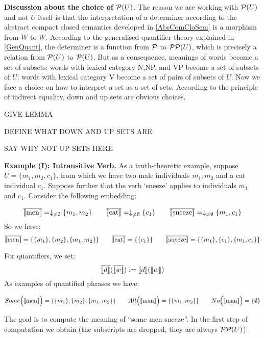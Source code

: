 \bigskip
\noindent
{\bf Discussion about the choice of ${\cal P}(U)$}. The reason we are working with ${\cal P}(U)$ and not $U$ itself is that the interpretation of a determiner according to the  abstract compact closed semantics developed in \ref{AbsComCloSem}  is a morphism from $W$ to $W$. According to the generalised quantifier theory explained in \ref{GenQuant}, the determiner is a function from ${\cal P}$ to ${\cal P}{\cal P}(U)$, which is precisely a relation from ${\cal P}(U)$ to ${\cal P}(U)$.  But as a consequence, meanings of words become a set of subsets: words with lexical category N,NP, and VP become  a set of subsets  of $U$; words with lexical category V become a set of pairs of subsets of $U$.  Now we face  a choice on how to interpret a set as a set of sets. According to the principle of indirect equality, down and up sets are obvious choices. 


GIVE LEMMA

DEFINE WHAT DOWN AND UP SETS ARE

SAY WHY NOT UP SETS HERE


\bigskip
\bigskip
\noindent
{\bf Example (I): Intransitive Verb.} As a truth-theoretic  example,  suppose $U = \{m_1, m_2, c_1\}$, from which we have two male individuals $m_1, m_2$  and a cat   individual $c_1$.  Suppose further that  the verb `sneeze'  applies to individuals $m_1$ and $c_1$. Consider the following embedding:

\[
\overline{[\![ \text{men} ]\!]} =  \downarrow_{\neq \emptyset}\{m_1, m_2\}  \qquad
\overline{[\![ \text{cat} ]\!]} =  \downarrow_{\neq \emptyset}\{c_1\}  \qquad
\overline{[\![ \text{sneeze} ]\!]} = \downarrow_{\neq \emptyset}\{m_1, c_1\}
\]
So we have:
\[
\overline{[\![ \text{men} ]\!]} =  \{\{m_1\}, \{m_2\}, \{m_1, m_2\}\}  \qquad
\overline{[\![ \text{cat} ]\!]} =  \{\{c_1\}\}  \qquad
\overline{[\![ \text{sneeze} ]\!]} = \{\{m_1\}, \{c_1\}, \{m_1, c_1\}\}
\]

\noindent
For  quantifiers, we set:
\[
\overline{\semantics{d}}  (\overline{\semantics{w}})  :=  \semantics{d}(\semantics{w}) 
\]
As examples of quantified phrases we have:

\[
Some\Big({[\![ \text{men} ]\!]}\Big) =  \{\{m_1\}, \{m_2\}, \{m_1, m_2\}\} \qquad
All\Big({[\![ \text{man} ]\!]}\Big) = \{\{m_1, m_2\}\} \qquad 
No\Big({[\![ \text{man} ]\!]}\Big) = \{\emptyset\} 
\]

\noindent
The goal is to compute the meaning of  ``some men sneeze''. In the first step of computation we obtain (the subscripts are dropped,  they are always ${\cal P}{\cal P}(U)$):

